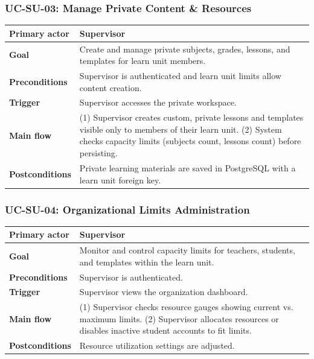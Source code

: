 \subsubsection{UC-SU-03: Manage Private Content \& Resources}
\begin{longtable}{L{0.28\textwidth}L{0.62\textwidth}}
\textbf{Primary actor} & Supervisor \\ \hline
\textbf{Goal} & Create and manage private subjects, grades, lessons, and templates for learn unit members. \\ \hline
\textbf{Preconditions} & Supervisor is authenticated and learn unit limits allow content creation. \\ \hline
\textbf{Trigger} & Supervisor accesses the private workspace. \\ \hline
\textbf{Main flow} & (1) Supervisor creates custom, private lessons and templates visible only to members of their learn unit. (2) System checks capacity limits (subjects count, lessons count) before persisting. \\ \hline
\textbf{Postconditions} & Private learning materials are saved in PostgreSQL with a learn unit foreign key. \\
\end{longtable}

\subsubsection{UC-SU-04: Organizational Limits Administration}
\begin{longtable}{L{0.28\textwidth}L{0.62\textwidth}}
\textbf{Primary actor} & Supervisor \\ \hline
\textbf{Goal} & Monitor and control capacity limits for teachers, students, and templates within the learn unit. \\ \hline
\textbf{Preconditions} & Supervisor is authenticated. \\ \hline
\textbf{Trigger} & Supervisor views the organization dashboard. \\ \hline
\textbf{Main flow} & (1) Supervisor checks resource gauges showing current vs. maximum limits. (2) Supervisor allocates resources or disables inactive student accounts to fit limits. \\ \hline
\textbf{Postconditions} & Resource utilization settings are adjusted. \\
\end{longtable}

